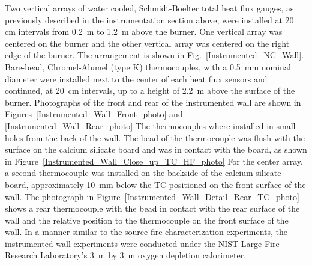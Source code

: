 \documentclass[twoside]{uocthesis}
\begin{document}
{Two vertical arrays of water cooled, Schmidt-Boelter total heat flux gauges, as previously described in the instrumentation section above, were installed at 20 cm intervals from 0.2~m to 1.2~m above the burner.  One vertical array was centered on the burner and the other vertical array was centered on the right edge of the burner. The arrangement is shown in Fig.~\ref{Instrumented_NC_Wall}. Bare-bead, Chromel-Alumel (type K) thermocouples, with a 0.5~mm nominal diameter were installed next to the center of each heat flux sensors and continued, at 20~cm intervals, up to a height of 2.2~m above the surface of the burner. Photographs of the front and rear of the instrumented wall are shown in Figures~\ref{Instrumented_Wall_Front_photo} and \ref{Instrumented_Wall_Rear_photo} The thermocouples where installed in small holes from the back of the wall.  The bead of the thermocouple was flush with the surface on the calcium silicate board and was in contact with the board, as shown in Figure~\ref{Instrumented_Wall_Close_up_TC_HF_photo} For the center array, a second thermocouple was installed on the backside of the calcium silicate board, approximately 10~mm below the TC positioned on the front surface of the wall. The photograph in Figure~\ref{Instrumented_Wall_Detail_Rear_TC_photo} shows a rear thermocouple with the bead in contact with the rear surface of the wall and the relative position to the thermocouple on the front surface of the wall. In a manner similar to the source fire characterization experiments, the instrumented wall experiments were conducted under the NIST Large Fire Research Laboratory's 3~m by 3~m oxygen depletion calorimeter.

}
\end{document}
